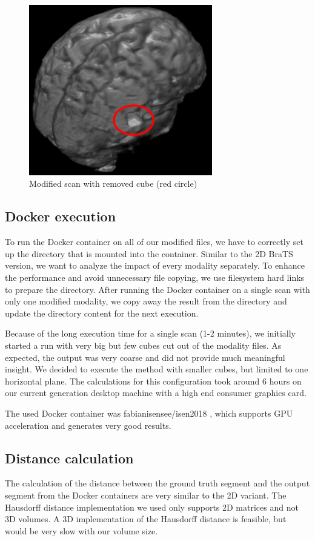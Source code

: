\begin{figure}[H]
\centering
\includegraphics[width=8cm]{chapters/07_brats3d/images/brain-hdm-marked.png}
\caption{Modified scan with removed cube (red circle)}
\label{brats3d_example}
\end{figure}

\subsection{Docker execution}
To run the Docker container on all of our modified files, we have to correctly set up the directory that is mounted into the container. Similar to the 2D BraTS version, we want to analyze the impact of every modality separately. To enhance the performance and avoid unnecessary file copying, we use filesystem hard links to prepare the directory. After running the Docker container on a single scan with only one modified modality, we copy away the result from the directory and update the directory content for the next execution.

Because of the long execution time for a single scan (1-2 minutes), we initially started a run with very big but few cubes cut out of the modality files. As expected, the output was very coarse and did not provide much meaningful insight. We decided to execute the method with smaller cubes, but limited to one horizontal plane. The calculations for this configuration took around 6 hours on our current generation desktop machine with a high end consumer graphics card.

The used Docker container was fabianisensee/isen2018 \cite{brats3ddocker}, which supports GPU acceleration and generates very good results.

\subsection{Distance calculation}
The calculation of the distance between the ground truth segment and the output segment from the Docker containers are very similar to the 2D variant. The Hausdorff distance implementation we used only supports 2D matrices and not 3D volumes. A 3D implementation of the Hausdorff distance is feasible, but would be very slow with our volume size. 

